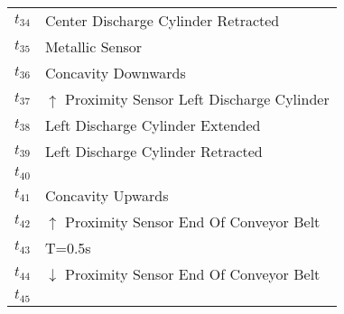 \begin{longtable}{M{5cm}M{10cm}}
\hyperlink{partialNet:t34}{\hypertarget{partialTable:t34}{$t_{34}$}} & Center Discharge Cylinder Retracted\\
\hyperlink{partialNet:t35}{\hypertarget{partialTable:t35}{$t_{35}$}} & Metallic Sensor\\
\hyperlink{partialNet:t36}{\hypertarget{partialTable:t36}{$t_{36}$}} & Concavity Downwards\\
\hyperlink{partialNet:t37}{\hypertarget{partialTable:t37}{$t_{37}$}} & \(\uparrow\) Proximity Sensor Left Discharge Cylinder\\
\hyperlink{partialNet:t38}{\hypertarget{partialTable:t38}{$t_{38}$}} & Left Discharge Cylinder Extended\\
\hyperlink{partialNet:t39}{\hypertarget{partialTable:t39}{$t_{39}$}} & Left Discharge Cylinder Retracted\\
\hyperlink{partialNet:t40}{\hypertarget{partialTable:t40}{$t_{40}$}} & \\
\hyperlink{partialNet:t41}{\hypertarget{partialTable:t41}{$t_{41}$}} & Concavity Upwards\\
\hyperlink{partialNet:t42}{\hypertarget{partialTable:t42}{$t_{42}$}} & \(\uparrow\) Proximity Sensor End Of Conveyor Belt\\
\hyperlink{partialNet:tt43}{\hypertarget{partialTable:tt43}{$t_{43}$}} & T=0.5s\\
\hyperlink{partialNet:t44}{\hypertarget{partialTable:t44}{$t_{44}$}} & \(\downarrow\) Proximity Sensor End Of Conveyor Belt\\
\hyperlink{partialNet:t45}{\hypertarget{partialTable:t45}{$t_{45}$}} & \\
\end{longtable}
